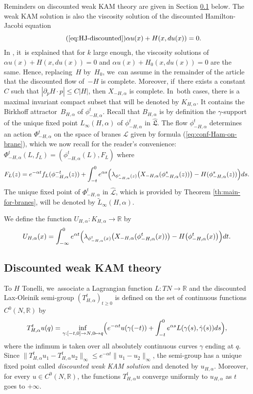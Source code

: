 \documentclass[JEP,XML,SOM,Unicode,NoFloatCountersInSection,published]{cedram}
\newcommand\mto{\mathchoice{\longmapsto}{\mapsto}{\mapsto}{\mapsto}}
\theoremstyle{definition}
\newcommand {\LL}{{\mathcal L}}
\newcommand{\R}{\mathbb{R}}
\newcommand{\fL}{\mathfrak {L}}
\newcommand{\hatL}{\widehat{\fL}}
\newcommand{\hatLL}{\widehat{\LL}}
\begin{document}
Reminders on discounted weak KAM theory are given in Section \ref{sec:Discounted-weak-KAM-theory} below. The weak KAM solution is also the viscosity solution of the discounted Hamilton-Jacobi equation\vspace*{-3pt}
\[
\tag{\ref{eq:HJ-discounted}}
\alpha u(x) + H(x,du(x))=0.
\]
In \cite[p.\,38]{DFIZ}, it~is explained that for $k$ large enough, the viscosity solutions of $\alpha u(x) + H(x,du(x))=0$ and $\alpha u(x) + H_0(x,du(x))=0 $ are the same. Hence, replacing~$H$ by~$H_0$, we~can assume in the remainder of the article that the discounted flow of~$-H$ is complete.
Moreover, if~there exists a constant $C$ such that \hbox{$|\partial_pH\cdot p|\leq C|H|$}, then $X_{-H, \alpha}$ is complete. In~both cases, there is a maximal invariant compact subset that will be denoted by $K_{H, \alpha}$. It contains the Birkhoff attractor~$B_{H, \alpha}$ of $\phi_{-H,\alpha}^t$. Recall that $B_{H,\alpha}$ is by definition the $\gamma$\nobreakdash-support of the unique fixed point $L_\infty(H, \alpha)$ of $\phi_{-H,\alpha}^t$ in $\hatL$. The flow $\phi_{-H,\alpha}^t$ determines an action $\Phi_{-H,\alpha}^t$ on the space of branes $\LL$ given by formula (\ref{eq:conf-Ham-on-brane}), which we now recall for the reader's convenience: $\Phi^t_{-H, \alpha}(L, f_L)=(\phi^t_{-H, \alpha}(L), F_L)$
where
\[
F_L(z)=e^{-\alpha t}f_L(\phi^{-t}_{-H, \alpha}(z))+\int_{-t}^0e^{\alpha s}\Bigl(\lambda_{\phi^s_{-H, \alpha}(z)}\bigl(X_{-H, \alpha}(\phi_{-H, \alpha}^s(z))\bigr)-H(\phi^s_{-H, \alpha}(z))\Bigr)ds.
\]
The unique fixed point of $\Phi_{-H,\alpha}^t$ in $\hatLL$, which is provided by Theorem \ref{th:main-for-branes}, will be denoted by $\tilde L_\infty(H, \alpha)$.

We define the function $U_{H, \alpha}:K_{H, \alpha}\to \R$ by
\[
U_{H, \alpha}(x)=\int_{-\infty}^0 e^{\alpha t}\Bigl(\lambda_{\phi_{-H, \alpha}^t(x)}\bigl(X_{-H, \alpha}(\phi_{-H, \alpha}^t(x))\bigr)-H\bigl(\phi_{-H, \alpha}^t(x)\bigr)\Bigr)dt.
\]

\subsection{Discounted weak KAM theory}\label{sec:Discounted-weak-KAM-theory}

To $H$ Tonelli, we~associate a Lagrangian function $L:TN\to\R$ and
the discounted Lax-Oleinik semi-group $(T_{H, \alpha}^t)_{t\geq 0}$ is defined on the set of continuous functions $C^0(N, \R)$ by
\begin{equation} \label{eq:DLO-semi-group} T_{H, \alpha}^tu(q)=\inf_{\gamma:[-t, 0]\to N, 0\mto q} \Bigl(e^{-\alpha t}u(\gamma(-t))+\int_{-t}^0 e^{\alpha s} L(\gamma (s), \dot \gamma (s)) ds\Bigr) ,\end{equation}
where
the infimum is taken over all absolutely continuous curves $\gamma$ ending at $q$. Since $\|T^t_{H, \alpha}u_1-T^t_{H, \alpha}u_2\|_\infty\leq e^{-\alpha t}\| u_1-u_2\|_\infty$, the semi-group has a unique fixed point called \emph{discounted weak KAM solution} and denoted by $u_{H, \alpha}$. Moreover, for every $u\in C^0(N, \R)$, the functions $T_{H, \alpha}^tu$ converge uniformly to $u_{H, \alpha}$ as $t$ goes to $+\infty$.
\end{document}
